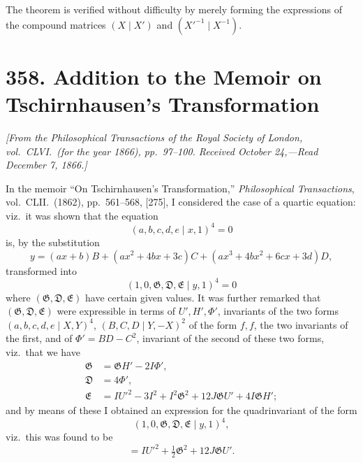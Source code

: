 \documentclass[11pt]{article}
\begin{document}
The theorem is verified without difficulty by merely forming the expressions of the compound matrices $(X \mid X')$ and $(X'^{-1} \mid X^{-1})$.

\bigskip
\section*{358. Addition to the Memoir on Tschirnhausen's Transformation}

\noindent\textit{[From the \textit{Philosophical Transactions of the Royal Society of London}, vol.~CLVI.\ (for the year 1866), pp.~97--100. Received October 24,---Read December 7, 1866.]}

\medskip

In the memoir ``On Tschirnhausen's Transformation,'' \textit{Philosophical Transactions}, vol.~CLII.\ (1862), pp.~561--568, [275], I considered the case of a quartic equation: viz.\ it was shown that the equation
\[
(a, b, c, d, e \mid x, 1)^{4} = 0
\]
is, by the substitution
\[
y = (a x + b) B + (a x^{2} + 4 b x + 3 c) C + (a x^{3} + 4 b x^{2} + 6 c x + 3 d) D,
\]
transformed into
\[
(1, 0, \mathfrak{G}, \mathfrak{D}, \mathfrak{E} \mid y, 1)^{4} = 0
\]
where $(\mathfrak{G}, \mathfrak{D}, \mathfrak{E})$ have certain given values. It was further remarked that $(\mathfrak{G}, \mathfrak{D}, \mathfrak{E})$ were expressible in terms of $U', H', \Phi'$, invariants of the two forms $(a, b, c, d, e \mid X, Y)^{4}$, $(B, C, D \mid Y, -X)^{2}$ of the form $f, f$, the two invariants of the first, and of $\Phi' = BD - C^{2}$, invariant of the second of these two forms, viz.\ that we have
\begin{align*}
\mathfrak{G} &= \mathfrak{G} H' - 2 I \Phi', \\
\mathfrak{D} &= 4 \Phi', \\
\mathfrak{E} &= I U'^{2} - 3 I^{2} + I^{2} \mathfrak{G}^{2} + 12 J \mathfrak{G} U' + 4 I \mathfrak{G} H';
\end{align*}
and by means of these I obtained an expression for the quadrinvariant of the form
\[
(1, 0, \mathfrak{G}, \mathfrak{D}, \mathfrak{E} \mid y, 1)^{4},
\]
viz.\ this was found to be
\[
= I U'^{2} + \tfrac{1}{2} \mathfrak{G}^{2} + 12 J \mathfrak{G} U'.
\]
\end{document}
